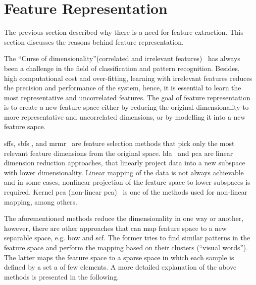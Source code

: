 \section{Feature Representation} \label{sec:chp2-sec4}
The previous section described why there is a need for feature extraction.
This section discusses the reasons behind feature representation.

The ``Curse of dimensionality''(correlated and irrelevant features)~\cite{Theodoridis2006327} has always been a challenge in the field of classification and pattern recognition. 
Besides, high computational cost and over-fitting, learning with irrelevant features reduces the precision and performance of the system, hence, it is essential to learn the most representative and uncorrelated features.  
The goal of feature representation is to create a new feature space either by reducing the original dimensionality to more representative and uncorrelated dimensions, or by modelling it into a new feature sapce.

\acf{sffs}, \acf{sbfs} \cite{ferri1994comparative}, and \acf{mrmr}~\cite{peng2005feature} are feature selection methods that pick only the most relevant feature dimensions from the original space.
\acf{lda}~\cite{martinez2001pca} and \ac{pca} are linear dimension reduction approaches, that linearly project data into a new subspace with lower dimensionality. 
Linear mapping of the data is not always achievable and in some cases, nonlinear projection of the feature space to lower subspaces is required.
Kernel \ac{pca} (non-linear \ac{pca})~\cite{mika1998kernel} is one of the methods used for non-linear mapping, among others.

The aforementioned methods reduce the dimensionality in one way or another, however, there are other approaches that can map feature space to a new separable space, e.g. \acf{bow} and \ac{scf}.
The former tries to find similar patterns in the feature space and perform the mapping based on their clusters (``visual words'').
The latter maps the feature space to a sparse space in which each sample is defined by a set a of few elements. 
A more detailed explanation of the above methods is presented in the following.

